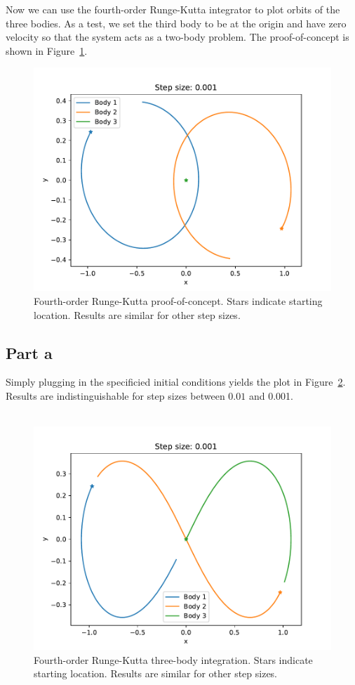 \documentclass[12pt,a4paper,twoside]{article}
\begin{document}
Now we can use the fourth-order Runge-Kutta integrator to plot orbits of the three bodies. As a test, we set the third body to be at the origin and have zero velocity so that the system acts as a two-body problem. The proof-of-concept is shown in Figure~\ref{fig:circ}.
\begin{figure}[h!]
  \centering
  \includegraphics[width=.9\textwidth]{figs/exercise03_0_stepsize001.pdf}
  \caption{Fourth-order Runge-Kutta proof-of-concept. Stars indicate starting location. Results are similar for other step sizes.} \label{fig:circ}
\end{figure}

\subsection*{Part a}
Simply plugging in the specificied initial conditions yields the plot in Figure~\ref{fig:2a}. Results are indistinguishable for step sizes between $0.01$ and 0.001.\\
\\
\begin{figure}[h!]
  \centering
  \includegraphics[width=.9\textwidth]{figs/exercise03_1_stepsize001.pdf}
  \caption{Fourth-order Runge-Kutta three-body integration. Stars indicate starting location. Results are similar for other step sizes.} \label{fig:2a}
\end{figure}
\end{document}
